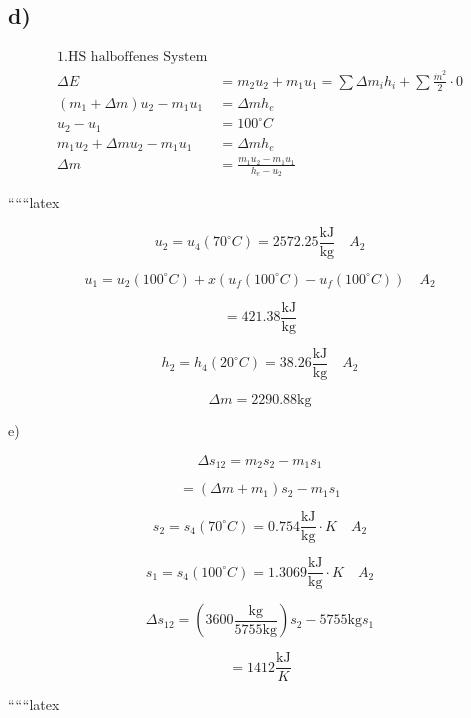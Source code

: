 \subsection*{d)}
\begin{align*}
\text{1.HS halboffenes System} \\
\Delta E &= m_2 u_2 + m_1 u_1 = \sum \Delta m_i h_i + \sum \frac{\dot{m}^2}{2} \cdot 0 \\
(m_1 + \Delta m) u_2 - m_1 u_1 &= \Delta m h_e \\
u_2 - u_1 &= 100^\circ C \\
m_1 u_2 + \Delta m u_2 - m_1 u_1 &= \Delta m h_e \\
\Delta m &= \frac{m_1 u_2 - m_1 u_1}{h_e - u_2}
\end{align*}

``````latex


\[
u_2 = u_4 (70^\circ C) = 2572.25 \frac{\text{kJ}}{\text{kg}} \quad A_2
\]

\[
u_1 = u_2 (100^\circ C) + x (u_f (100^\circ C) - u_f (100^\circ C)) \quad A_2
\]

\[
= 421.38 \frac{\text{kJ}}{\text{kg}}
\]

\[
h_2 = h_4 (20^\circ C) = 38.26 \frac{\text{kJ}}{\text{kg}} \quad A_2
\]

\[
\Delta m = 2290.88 \text{kg}
\]

e) 

\[
\Delta s_{12} = m_2 s_2 - m_1 s_1
\]

\[
= (\Delta m + m_1) s_2 - m_1 s_1
\]

\[
s_2 = s_4 (70^\circ C) = 0.754 \frac{\text{kJ}}{\text{kg}} \cdot K \quad A_2
\]

\[
s_1 = s_4 (100^\circ C) = 1.3069 \frac{\text{kJ}}{\text{kg}} \cdot K \quad A_2
\]

\[
\Delta s_{12} = \left(3600 \frac{\text{kg}}{5755 \text{kg}}\right) s_2 - 5755 \text{kg} s_1
\]

\[
= 1412 \frac{\text{kJ}}{K}
\]

``````latex


